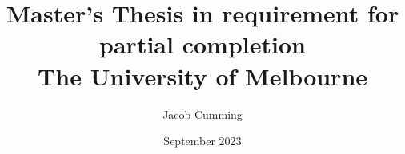 \documentclass{book}
\begin{document}

\title{
{Master's Thesis in requirement for partial completion}\\
{\large The University of Melbourne}
}
\date{September 2023}
\author{Jacob Cumming}

\maketitle
{}
\tableofcontents

\listoffigures

% 
% 


\newpage

% 





% 


% 
% 
% 


\printbibliography
\end{document}

